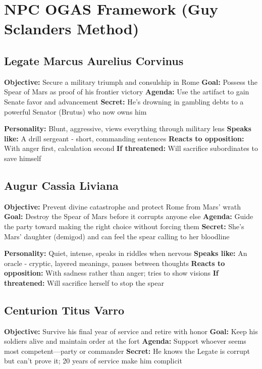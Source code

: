 \documentclass[
]{book}
\begin{document}
\section{NPC OGAS Framework (Guy Sclanders
Method)}\label{npc-ogas-framework-guy-sclanders-method}

\subsection{Legate Marcus Aurelius
Corvinus}\label{legate-marcus-aurelius-corvinus}

\textbf{Objective:} Secure a military triumph and consulship in Rome
\textbf{Goal:} Possess the Spear of Mars as proof of his frontier
victory \textbf{Agenda:} Use the artifact to gain Senate favor and
advancement \textbf{Secret:} He's drowning in gambling debts to a
powerful Senator (Brutus) who now owns him

\textbf{Personality:} Blunt, aggressive, views everything through
military lens \textbf{Speaks like:} A drill sergeant - short, commanding
sentences \textbf{Reacts to opposition:} With anger first, calculation
second \textbf{If threatened:} Will sacrifice subordinates to save
himself

\subsection{Augur Cassia Liviana}\label{augur-cassia-liviana}

\textbf{Objective:} Prevent divine catastrophe and protect Rome from
Mars' wrath \textbf{Goal:} Destroy the Spear of Mars before it corrupts
anyone else \textbf{Agenda:} Guide the party toward making the right
choice without forcing them \textbf{Secret:} She's Mars' daughter
(demigod) and can feel the spear calling to her bloodline

\textbf{Personality:} Quiet, intense, speaks in riddles when nervous
\textbf{Speaks like:} An oracle - cryptic, layered meanings, pauses
between thoughts \textbf{Reacts to opposition:} With sadness rather than
anger; tries to show visions \textbf{If threatened:} Will sacrifice
herself to stop the spear

\subsection{Centurion Titus Varro}\label{centurion-titus-varro}

\textbf{Objective:} Survive his final year of service and retire with
honor \textbf{Goal:} Keep his soldiers alive and maintain order at the
fort \textbf{Agenda:} Support whoever seems most competent---party or
commander \textbf{Secret:} He knows the Legate is corrupt but can't
prove it; 20 years of service make him complicit
\end{document}
